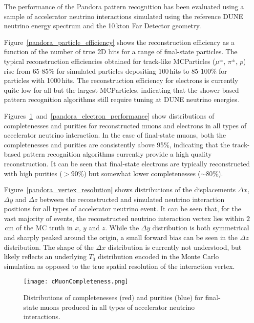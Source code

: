 The performance of the Pandora pattern recognition has been evaluated using a sample of accelerator neutrino interactions simulated using the reference DUNE neutrino energy spectrum and the 10\,kton Far Detector geometry. 


Figure~\ref{pandora_particle_efficiency} shows the reconstruction efficiency as a function of the number of true 2D hits for a range of final-state particles. The typical reconstruction efficiencies obtained for track-like MCParticles ($\mu^{\pm}$, $\pi^{\pm}$, $p$) rise from 65-85\% for simulated particles depositing 100\,hits to 85-100\% for particles with 1000\,hits. The reconstruction efficiency for electrons is currently quite low for all but the largest MCParticles, indicating that the shower-based pattern recognition algorithms still require tuning at DUNE neutrino energies. 

Figures~\ref{pandora_muon_performance}~and~\ref{pandora_electron_performance} show distributions of completenesses and purities for reconstructed muons and electrons in all types of accelerator neutrino interaction. In the case of final-state muons, both the completenesses and purities are consistently above 95\%, indicating that the track-based pattern recognition algorithms currently provide a high quality reconstruction. It can be seen that final-state electrons are typically reconstructed with high purities ($>90\%$) but somewhat lower completenesses ($\sim 80\%$).

Figure~\ref{pandora_vertex_resolution} shows distributions of the displacements $\Delta x$, $\Delta y$ and $\Delta z$ between the reconstructed and simulated neutrino interaction positions for all types of accelerator neutrino event. It can be seen that, for the vast majority of events, the reconstructed neutrino  interaction vertex lies within $2$\,cm of the MC truth in $x$, $y$ and $z$. While the $\Delta y$ distribution is both symmetrical and sharply peaked around the origin, a small forward bias can be seen in the $\Delta z$ distribution. The shape of the $\Delta x$ distribution is currently not understood, but likely reflects an underlying $T_{0}$ distribution encoded in the Monte Carlo simulation as opposed to the true spatial resolution of the interaction vertex.

\begin{figure}[!ht]
\centering
\texttt{[image: cMuonCompleteness.png]}
\caption{Distributions of completenesses (red) and purities (blue) for final-state muons produced in all types of accelerator neutrino interactions.}
\label{pandora_muon_performance}
\end{figure}


